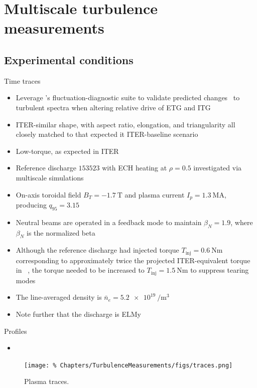 \chapter{Multiscale turbulence measurements}
\label{ch:TurbulenceMeasurements}


\section{Experimental conditions}

Time traces
\begin{itemize}
  \item Leverage \diiid's fluctuation-diagnostic suite
    to validate predicted changes~\cite{howard_pp16}
    to turbulent spectra when altering relative drive
    of ETG and ITG
  \item ITER-similar shape, with aspect ratio, elongation, and triangularity
    all closely matched to that expected it ITER-baseline scenario
  \item Low-torque, as expected in ITER
  \item Reference discharge $153523$ with ECH heating at $\rho = 0.5$
    investigated via multiscale simulations~\cite{holland_nf17}
  \item On-axis toroidal field $B_T = \SI{-1.7}{\tesla}$ and
    plasma current $I_p = \SI{1.3}{\mega\ampere}$,
    producing $q_{95} = 3.15$
  \item Neutral beams are operated in a feedback mode to maintain
    $\beta_N = 1.9$, where
    $\beta_N$ is the normalized beta~\cite[Sec.~6.18]{wesson}
  \item Although the reference discharge had injected torque
    $T_{\text{inj}} = \SI{0.6}{\newton\meter}$
    corresponding to approximately twice
    the projected ITER-equivalent torque in \diiid~\cite{garofalo_nf11},
    the torque needed to be increased to
    $T_{\text{inj}} = \SI{1.5}{\newton\meter}$
    to suppress tearing modes
  \item The line-averaged density is
    $\bar{n}_e = \SI{5.2e19}{\per\meter\cubed}$
  \item Note further that the discharge is ELMy
\end{itemize}

Profiles
\begin{itemize}
  \item 
\end{itemize}

\begin{figure}[h!]
  \centering
  \texttt{[image: \%
    Chapters/TurbulenceMeasurements/figs/traces.png]}
  \caption[Plasma traces]{%
    Plasma traces.
  }
\label{fig:TurbulenceMeasurements:traces}
\end{figure}


